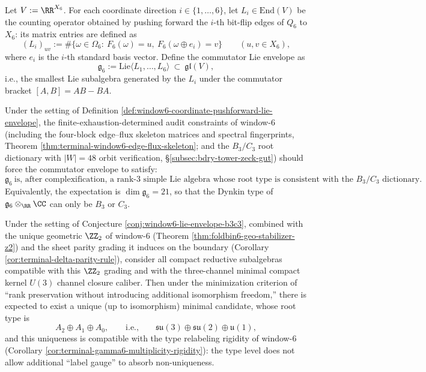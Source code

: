 \begin{definition}\label{def:window6-coordinate-pushforward-lie-envelope}
Let \(V:=\RR^{X_6}\).
For each coordinate direction \(i\in\{1,\dots,6\}\), let \(L_i\in \mathrm{End}(V)\) be the counting operator obtained by pushing forward the \(i\)-th bit-flip edges of \(Q_6\) to \(X_6\): its matrix entries are defined as
\[
(L_i)_{uv}:=\#\bigl\{\omega\in\Omega_6:\ F_6(\omega)=u,\ F_6(\omega\oplus e_i)=v\bigr\}
\qquad (u,v\in X_6),
\]
where \(e_i\) is the \(i\)-th standard basis vector.
Define the commutator Lie envelope as
\[
\mathfrak{g}_6:=\mathrm{Lie}\langle L_1,\dots,L_6\rangle\ \subset\ \mathfrak{gl}(V),
\]
i.e., the smallest Lie subalgebra generated by the \(L_i\) under the commutator bracket \([A,B]=AB-BA\).
\end{definition}

\begin{conjecture}\label{conj:window6-lie-envelope-b3c3}
Under the setting of Definition \ref{def:window6-coordinate-pushforward-lie-envelope},
the finite-exhaustion-determined audit constraints of window-\(6\) (including the four-block edge--flux skeleton matrices and spectral fingerprints, Theorem \ref{thm:terminal-window6-edge-flux-skeleton}; and the \(B_3/C_3\) root dictionary with \(|W|=48\) orbit verification, \S\ref{subsec:bdry-tower-zeck-gut}) should force the commutator envelope to satisfy:
\[
\mathfrak{g}_6\ \text{is, after complexification, a rank-}3\text{ simple Lie algebra whose root type is consistent with the }B_3/C_3\text{ dictionary.}
\]
Equivalently, the expectation is \(\dim\mathfrak{g}_6=21\), so that the Dynkin type of \(\mathfrak{g}_6\otimes_\RR\CC\) can only be \(B_3\) or \(C_3\).
\end{conjecture}

\begin{conjecture}\label{conj:window6-sm-gauge-as-minimal-compact-observable}
Under the setting of Conjecture \ref{conj:window6-lie-envelope-b3c3}, combined with the unique geometric \(\ZZ_2\) of window-\(6\) (Theorem \ref{thm:foldbin6-geo-stabilizer-z2}) and the sheet parity grading it induces on the boundary (Corollary \ref{cor:terminal-delta-parity-rule}),
consider all compact reductive subalgebras compatible with this \(\ZZ_2\) grading and with the three-channel minimal compact kernel \(U(3)\) channel closure caliber.
Then under the minimization criterion of ``rank preservation without introducing additional isomorphism freedom,'' there is expected to exist a unique (up to isomorphism) minimal candidate, whose root type is
\[
A_2\oplus A_1\oplus A_0,
\qquad\text{i.e.,}\qquad
\mathfrak{su}(3)\oplus\mathfrak{su}(2)\oplus\mathfrak{u}(1),
\]
and this uniqueness is compatible with the type relabeling rigidity of window-\(6\) (Corollary \ref{cor:terminal-gamma6-multiplicity-rigidity}): the type level does not allow additional ``label gauge'' to absorb non-uniqueness.
\end{conjecture}

